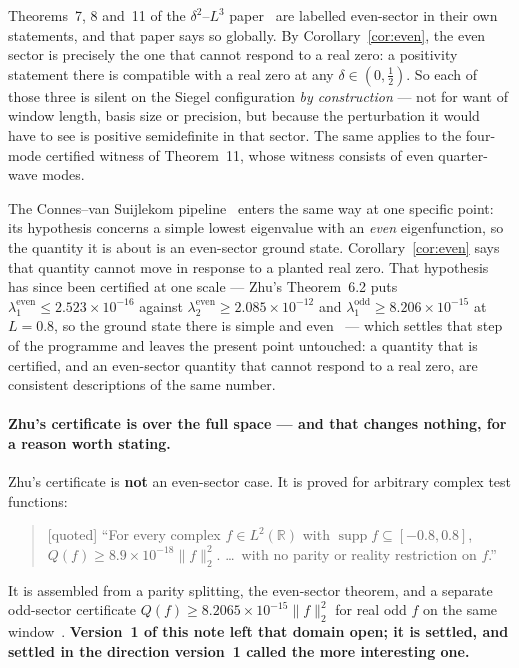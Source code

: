 \documentclass[11pt,a4paper]{article}
\theoremstyle{remark}
\newcommand{\tier}[1]{{\small\textsf{[#1]}}}
\begin{document}
Theorems~7, 8 and~11 of the $\delta^2$--$L^3$ paper~\cite{deltaL3} are labelled
even-sector in their own statements, and that paper says so globally. By
Corollary~\ref{cor:even}, the even sector is precisely the one that cannot respond to a
real zero: a positivity statement there is compatible with a real zero at any
$\delta\in(0,\tfrac12)$. So each of those three is silent on the Siegel configuration
\emph{by construction} --- not for want of window length, basis size or precision, but
because the perturbation it would have to see is positive semidefinite in that sector. The
same applies to the four-mode certified witness of Theorem~11, whose witness consists of
even quarter-wave modes.

The Connes--van Suijlekom pipeline~\cite{CvS} enters the same way at one specific point:
its hypothesis concerns a simple lowest eigenvalue with an \emph{even} eigenfunction, so
the quantity it is about is an even-sector ground state. Corollary~\ref{cor:even} says
that quantity cannot move in response to a planted real zero. That hypothesis has since
been certified at one scale --- Zhu's Theorem~6.2 puts
$\lambda_1^{\mathrm{even}}\le2.523\times10^{-16}$ against
$\lambda_2^{\mathrm{even}}\ge2.085\times10^{-12}$ and
$\lambda_1^{\mathrm{odd}}\ge8.206\times10^{-15}$ at $L=0.8$, so the ground state there is
simple and even~\cite{Zhu} --- which settles that step of the programme and leaves the
present point untouched: a quantity that is certified, and an even-sector quantity that
cannot respond to a real zero, are consistent descriptions of the same number.

\paragraph{Zhu's certificate is over the full space --- and that changes nothing, for a
reason worth stating.} Zhu's certificate is \textbf{not} an even-sector case. It is proved
for arbitrary complex test functions:
\begin{quote}
\tier{quoted} ``For every complex $f\in L^2(\mathbb R)$ with
$\operatorname{supp}f\subseteq[-0.8,0.8]$, $Q(f)\ge8.9\times10^{-18}\|f\|_2^2$. \dots\ with
no parity or reality restriction on $f$.''~\cite[Cor.~6.3]{Zhu}
\end{quote}
It is assembled from a parity splitting, the even-sector theorem, and a separate odd-sector
certificate $Q(f)\ge8.2065\times10^{-15}\|f\|_2^2$ for real odd $f$ on the same
window~\cite[Lem.~6.1, Thm.~1.2, eq.~(14)]{Zhu}. \textbf{Version~1 of this note left that
domain open; it is settled, and settled in the direction version~1 called the more
interesting one.}
\end{document}
